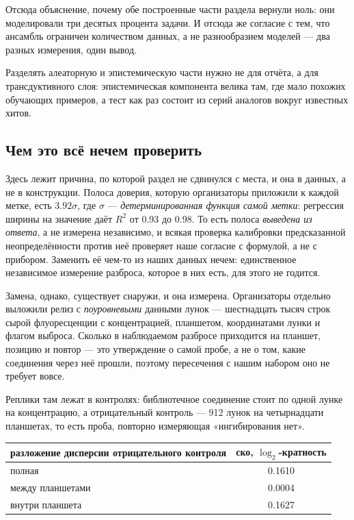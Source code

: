 Отсюда объяснение, почему обе построенные части раздела вернули ноль: они моделировали три десятых
процента задачи. И отсюда же согласие с тем, что ансамбль ограничен количеством данных, а не
разнообразием моделей --- два разных измерения, один вывод.

Разделять алеаторную и эпистемическую части нужно не для отчёта, а для трансдуктивного слоя:
эпистемическая компонента велика там, где мало похожих обучающих примеров, а тест как раз состоит
из серий аналогов вокруг известных хитов.

\subsection{Чем это всё нечем проверить}

Здесь лежит причина, по которой раздел не сдвинулся с места, и она в данных, а не в конструкции.
Полоса доверия, которую организаторы приложили к каждой метке, есть $3.92\sigma$, где $\sigma$ ---
\emph{детерминированная функция самой метки}: регрессия ширины на значение даёт $R^2$ от 0.93 до 0.98.
То есть полоса \emph{выведена из ответа}, а не измерена независимо, и всякая проверка калибровки
предсказанной неопределённости против неё проверяет наше согласие с формулой, а не с прибором.
Заменить её чем-то из наших данных нечем: единственное независимое измерение разброса, которое в них
есть, для этого не годится.

Замена, однако, существует снаружи, и она измерена. Организаторы отдельно выложили релиз с
\emph{поуровневыми} данными лунок --- шестнадцать тысяч строк сырой флуоресценции с концентрацией,
планшетом, координатами лунки и флагом выброса. Сколько в наблюдаемом разбросе приходится на планшет,
позицию и повтор --- это утверждение о самой пробе, а не о том, какие соединения через неё прошли,
поэтому пересечения с нашим набором оно не требует вовсе.

Реплики там лежат в контролях: библиотечное соединение стоит по одной лунке на концентрацию, а
отрицательный контроль --- 912 лунок на четырнадцати планшетах, то есть проба, повторно измеряющая
«ингибирования нет».

\begin{center}
\begin{tabular}{lc}
\toprule
разложение дисперсии отрицательного контроля & ско, $\log_2$-кратность \\
\midrule
полная            & 0.1610 \\
между планшетами  & 0.0004 \\
внутри планшета   & 0.1627 \\
\bottomrule
\end{tabular}
\end{center}

